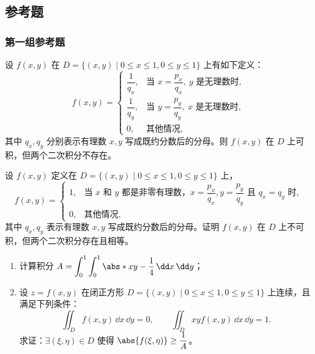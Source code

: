 \subsection{参考题}

\subsubsection*{第一组参考题}

\begin{xreferenceproblem}[1]
设 $f(x,y)$ 在 $D=\{(x,y)\mid0\le x\le1,0\le y\le1\}$ 上有如下定义：
  \[
    f(x,y)=
    \begin{cases}
      \dfrac1{q_x}, & \text{当 }x=\dfrac{p_x}{q_x},\ y\text{ 是无理数时},\\
      \dfrac1{q_y}, & \text{当 }y=\dfrac{p_y}{q_y},\ x\text{ 是无理数时},\\
      0, & \text{其他情况},
    \end{cases}
  \]
  其中 $q_x,q_y$ 分别表示有理数 $x,y$ 写成既约分数后的分母。则 $f(x,y)$ 在 $D$ 上可积，但两个二次积分不存在。
\end{xreferenceproblem}

\begin{xreferenceproblem}[2]
设 $f(x,y)$ 定义在 $D=\{(x,y)\mid0\le x\le1,0\le y\le1\}$ 上，
  \[
    f(x,y)=
    \begin{cases}
      1, & \text{当 }x\text{ 和 }y\text{ 都是非零有理数，}x=\dfrac{p_x}{q_x},y=\dfrac{p_y}{q_y}\text{ 且 }q_x=q_y\text{ 时},\\
      0, & \text{其他情况},
    \end{cases}
  \]
  其中 $q_x,q_y$ 表示有理数 $x,y$ 写成既约分数后的分母。证明 $f(x,y)$ 在 $D$ 上不可积，但两个二次积分存在且相等。
\end{xreferenceproblem}

\begin{xreferenceproblem}[3]
\begin{enumerate}[label=(\arabic*)]
    \item 计算积分 $\displaystyle A=\int_0^1\int_0^1\abs*{xy-\frac14}\,\dd x\,\dd y$；
    \item 设 $z=f(x,y)$ 在闭正方形 $D=\{(x,y)\mid0\le x\le1,0\le y\le1\}$ 上连续，且满足下列条件：
    \[
      \iint_D f(x,y)\,\dd x\,\dd y=0,
      \qquad
      \iint_D xyf(x,y)\,\dd x\,\dd y=1.
    \]
    求证：$\exists(\xi,\eta)\in D$ 使得 $\abs{f(\xi,\eta)}\ge\dfrac1A$。
  \end{enumerate}
\end{xreferenceproblem}

